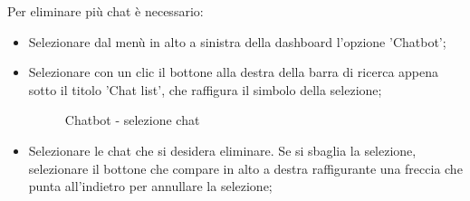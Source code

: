 \documentclass[10pt, a4paper]{article}
\begin{document}
Per eliminare più chat è necessario:
\begin{itemize}
    \item Selezionare dal menù in alto a sinistra della dashboard l'opzione 'Chatbot';
    \item Selezionare con un clic il bottone alla destra della barra di ricerca appena sotto il titolo 'Chat list', che raffigura il simbolo della selezione;
    \begin{figure}[H]
        \centering  
        \caption{Chatbot - selezione chat}
    \end{figure}
    \item Selezionare le chat che si desidera eliminare. Se si sbaglia la selezione, selezionare il bottone che compare in alto a destra raffigurante una freccia che punta all'indietro per annullare la selezione;
    

\end{itemize}
\end{document}
